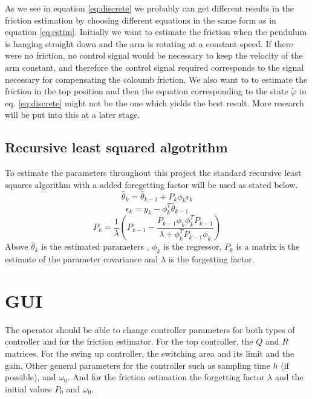 \documentclass[10pt,a4paper]{article}
\begin{document}
As we see in equation \ref{eq:discrete} we probably can get different results in the friction estimation by choosing different equations in the same form as in equation \ref{eq:estim}. Initially we want to estimate the friction when the pendulum is hanging straight down and the arm is rotating at a constant speed. If there were no friction, no control signal would be necessary to keep the velocity of the arm constant, and therefore the control signal required corresponds to the signal necessary for compensating the coloumb friction.
We also want to to estimate the friction in the top position and then the equation corresponding to the state $ \dot{\varphi} $ in eq. \ref{eq:discrete} might not be the one which yields the best result. More research will be put into this at a later stage.

\subsection{Recursive least squared algotrithm}
\label{subsec:rlsalg}
To estimate the parameters throughout this project the standard recursive least squares algorithm with a added foregetting factor will be used as stated below. 
\begin{equation}
\hat{\theta}_k = \hat{\theta}_{k-1}+P_k\phi_k\epsilon_k 
\end{equation}
\begin{equation}
\epsilon_k=y_k-\phi_k^{T}\hat{\theta}_{k-1} 
\end{equation}
\begin{equation}
P_k=\frac{1}{\lambda}(P_{k-1}-\frac{P_{k-1}\phi_k\phi_k^{T}P_{k-1}}{\lambda+\phi_k^{T}P_{k-1}\phi_k})
\end{equation}
Above $\hat{\theta}_k$ is the estimated parameters , $\phi_k$ is the regressor, $P_k$ is a matrix is the estimate of the parameter covariance and $\lambda$ is the forgetting factor.

\section{GUI}
The operator should be able to change controller parameters for both types of controller and for the friction estimator. For the top controller, the $Q$ and $R$ matrices. For the swing up controller, the switching area and its limit and the gain. Other general parameters for the controller such as sampling time $h$ (if possible), and $\omega _0$. And for the friction estimation the forgetting factor $\lambda$ and the initial values $P_0$ and $\omega _0$.
\end{document}
